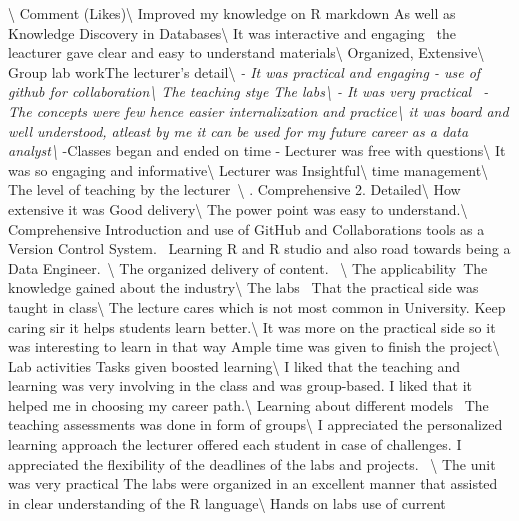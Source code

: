 \documentclass[
]{article}
\begin{document}
\textbackslash{} \toprule Comment (Likes)\textbackslash{} \midrule
Improved my knowledge on R markdown As well as Knowledge Discovery in
Databases\textbackslash{} \hline It was interactive and engaging~ the
leacturer gave clear and easy to understand materials\textbackslash{}
\hline Organized, Extensive\textbackslash{} \hline Group lab workThe
lecturer's detail\textbackslash{} \hline \emph{- It was practical and
engaging - use of github for collaboration\textbackslash{} \hline The
teaching stye The labs\textbackslash{} \hline - It was very practical~ -
The concepts were few hence easier internalization and
practice\textbackslash{} \hline it was board and well understood,
atleast by me it can be used for my future career as a data
analyst\textbackslash{} \hline }-Classes began and ended on time -
Lecturer was free with questions\textbackslash{} \hline It was so
engaging and informative\textbackslash{} \hline Lecturer was
Insightful\textbackslash{} \hline time management\textbackslash{} \hline
The level of teaching by the lecturer~\textbackslash{} . Comprehensive 2. Detailed\textbackslash{} \hline How extensive it was
Good delivery\textbackslash{} \hline The power point was easy to
understand.\textbackslash{} \hline Comprehensive Introduction and use of
GitHub and Collaborations tools as a Version Control System.~ Learning R
and R studio and also road towards being a Data
Engineer.~\textbackslash{} \hline The organized delivery of content.
~\textbackslash{} \hline The applicability~The knowledge gained about
the industry\textbackslash{} \hline The labs~ That the practical side
was taught in class\textbackslash{} \hline The lecture cares which is
not most common in University. Keep caring sir it helps students learn
better.\textbackslash{} \hline It was more on the practical side so it
was interesting to learn in that way Ample time was given to finish the
project\textbackslash{} \hline Lab activities Tasks given boosted
learning\textbackslash{} \hline I liked that the teaching and learning
was very involving in the class and was group-based. I liked that it
helped me in choosing my career path.\textbackslash{} \hline Learning
about different models~ The teaching assessments was done in form of
groups\textbackslash{} \hline I appreciated the personalized learning
approach the lecturer offered each student in case of challenges. I
appreciated the flexibility of the deadlines of the labs and projects.
~\textbackslash{} \hline The unit was very practical The labs were
organized in an excellent manner that assisted in clear understanding of
the R language\textbackslash{} \hline Hands on labs use of current
\end{document}

